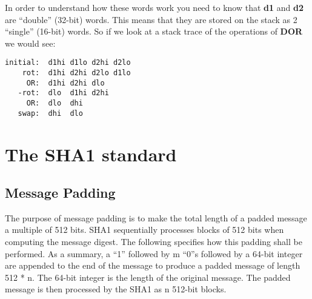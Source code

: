 In order to understand how these words work you need to know that
{\bf d1} and {\bf d2} are ``double'' (32-bit) words. This means that they are
stored on the stack as 2 ``single'' (16-bit) words. So if we look at a
stack trace of the operations of {\bf DOR} we would see:
\begin{verbatim}
initial:  d1hi d1lo d2hi d2lo
    rot:  d1hi d2hi d2lo d1lo
     OR:  d1hi d2hi dlo
   -rot:  dlo  d1hi d2hi
     OR:  dlo  dhi
   swap:  dhi  dlo
\end{verbatim}

\section{The SHA1 standard \cite{30}}
\subsection{Message Padding}

The purpose of message padding is to make the total length of a padded
message a multiple of 512 bits. SHA1 sequentially processes blocks of
512 bits when computing the message digest. The following specifies
how this padding shall be performed. As a summary, a ``1'' followed by
m ``0''s followed by a 64-bit integer are appended to the end of the
message to produce a padded message of length 512 * n. The 64-bit
integer is the length of the original message. The padded message is then
processed by the SHA1 as n 512-bit blocks.

